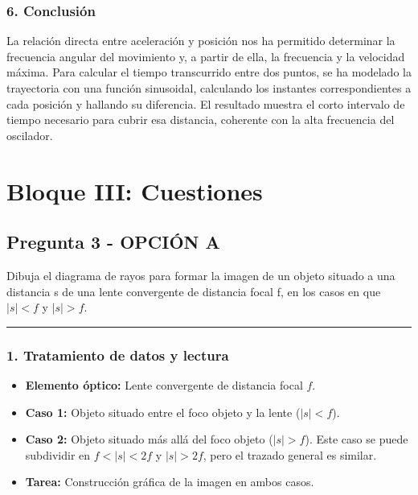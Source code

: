 \subsubsection*{6. Conclusión}
\begin{cajaconclusion}
La relación directa entre aceleración y posición nos ha permitido determinar la frecuencia angular del movimiento y, a partir de ella, la frecuencia y la velocidad máxima. Para calcular el tiempo transcurrido entre dos puntos, se ha modelado la trayectoria con una función sinusoidal, calculando los instantes correspondientes a cada posición y hallando su diferencia. El resultado muestra el corto intervalo de tiempo necesario para cubrir esa distancia, coherente con la alta frecuencia del oscilador.
\end{cajaconclusion}

\newpage

\section{Bloque III: Cuestiones}
\label{sec:optica_2006_sep}

\subsection{Pregunta 3 - OPCIÓN A}
\label{subsec:3A_2006_sep}

\begin{cajaenunciado}
Dibuja el diagrama de rayos para formar la imagen de un objeto situado a una distancia s de una lente convergente de distancia focal f, en los casos en que $|s|<f$ y $|s|>f$. 
\end{cajaenunciado}
\hrule

\subsubsection*{1. Tratamiento de datos y lectura}
\begin{itemize}
    \item \textbf{Elemento óptico:} Lente convergente de distancia focal $f$.
    \item \textbf{Caso 1:} Objeto situado entre el foco objeto y la lente ($|s| < f$).
    \item \textbf{Caso 2:} Objeto situado más allá del foco objeto ($|s| > f$). Este caso se puede subdividir en $f < |s| < 2f$ y $|s| > 2f$, pero el trazado general es similar.
    \item \textbf{Tarea:} Construcción gráfica de la imagen en ambos casos.
\end{itemize}

